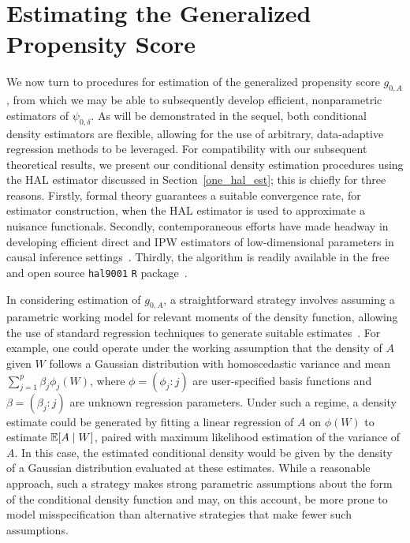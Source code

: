 \section{Estimating the Generalized Propensity Score}\label{methods}

We now turn to procedures for estimation of the generalized propensity score
$g_{0,A}$, from which we may be able to subsequently develop efficient,
nonparametric estimators of $\psi_{0,\delta}$. As will be demonstrated in the
sequel, both conditional density estimators are flexible, allowing for the use
of arbitrary, data-adaptive regression methods to be leveraged. For
compatibility with our subsequent theoretical results, we present our
conditional density estimation procedures using the HAL estimator discussed in
Section~\ref{one_hal_est}; this is chiefly for three reasons. Firstly, formal
theory guarantees a suitable convergence rate, for estimator construction, when
the HAL estimator is used to approximate a nuisance functionals. Secondly,
contemporaneous efforts have made headway in developing efficient direct and IPW
estimators of low-dimensional parameters in causal inference
settings~\citep{vdl2019efficient,ertefaie2020nonparametric}. Thirdly, the
algorithm is readily available in the free and open source \texttt{hal9001}
\texttt{R} package~\citep{coyle2021hal9001, hejazi2020hal9001}.

In considering estimation of $g_{0,A}$, a straightforward strategy involves
assuming a parametric working model for relevant moments of the density
function, allowing the use of standard regression techniques to generate
suitable estimates~\citep{robins2000marginal,
hirano2004propensity,imai2004causal}. For example, one could operate under the
working assumption that the density of $A$ given $W$ follows a Gaussian
distribution with homoscedastic variance and mean $\sum_{j=1}^p \beta_j
\phi_j(W)$, where $\phi = (\phi_j : j)$ are user-specified basis functions and
$\beta = (\beta_j : j)$ are unknown regression parameters. Under such a regime,
a density estimate could be generated by fitting a linear regression of $A$ on
$\phi(W)$ to estimate $\mathbb{E}[A \mid W]$, paired with maximum likelihood estimation
of the variance of $A$. In this case, the estimated conditional density would be
given by the density of a Gaussian distribution evaluated at these estimates.
While a reasonable approach, such a strategy makes strong parametric assumptions
about the form of the conditional density function and may, on this account, be
more prone to model misspecification than alternative strategies that make fewer
such assumptions.

